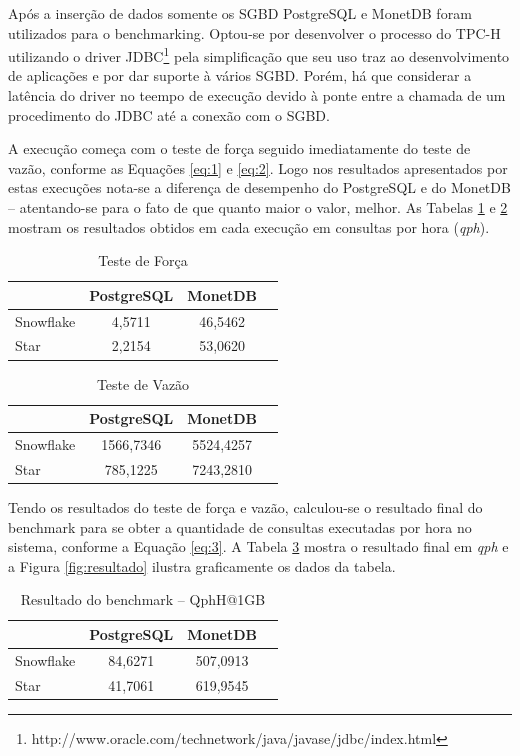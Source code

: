 \documentclass[conference]{IEEEtran}
\begin{document}
Após a inserção de dados somente os SGBD PostgreSQL e MonetDB foram utilizados para o benchmarking.  Optou-se por desenvolver o processo do TPC-H utilizando o driver JDBC\footnote{http://www.oracle.com/technetwork/java/javase/jdbc/index.html} pela simplificação que seu uso traz ao desenvolvimento de aplicações e por dar suporte à vários SGBD. Porém, há que considerar a latência do driver no teempo de execução devido à ponte entre a chamada de um procedimento do JDBC até a conexão com o SGBD. 

A execução começa com o teste de força seguido imediatamente do teste de vazão, conforme as Equações \ref{eq:1} e \ref{eq:2}. Logo nos resultados apresentados por estas execuções nota-se a diferença de desempenho do PostgreSQL e do MonetDB -- atentando-se para o fato de que quanto maior o valor, melhor. As Tabelas \ref{tab:força} e \ref{tab:vazão} mostram os resultados obtidos em cada execução em consultas por hora (\textit{qph}).

\begin{table}[htpb]
\centering
\caption{Teste de Força}
\label{tab:força}
\begin{tabular}{@{}lccc@{}}
\toprule
          & PostgreSQL & MonetDB \\ \midrule
Snowflake & 4,5711     & 46,5462   \\
Star      & 2,2154        & 53,0620     \\ \bottomrule
\end{tabular}
\end{table}

\begin{table}[htpb]
\centering
\caption{Teste de Vazão}
\label{tab:vazão}
\begin{tabular}{@{}lccc@{}}
\toprule
          & PostgreSQL & MonetDB \\ \midrule
Snowflake & 1566,7346     & 5524,4257   \\
Star      & 785,1225        & 7243,2810    \\ \bottomrule
\end{tabular}
\end{table}

Tendo os resultados do teste de força e vazão, calculou-se o resultado final do benchmark para se obter a quantidade de consultas executadas por hora no sistema, conforme a Equação \ref{eq:3}. A Tabela \ref{tab:resultado} mostra o resultado final em \textit{qph} e a Figura \ref{fig:resultado} ilustra graficamente os dados da tabela.

\begin{table}[htpb]
\centering
\caption{Resultado do benchmark -- QphH@1GB}
\label{tab:resultado}
\begin{tabular}{@{}lccc@{}}
\toprule
          & PostgreSQL & MonetDB \\ \midrule
Snowflake & 84,6271     & 507,0913   \\
Star      & 41,7061        & 619,9545    \\ \bottomrule
\end{tabular}
\end{table}
\end{document}
